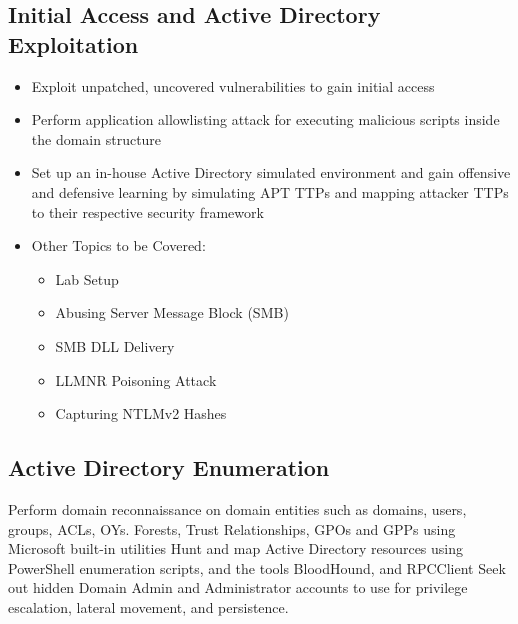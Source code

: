 \documentclass{article}
\begin{document}
\subsection{Initial Access and Active Directory Exploitation}
\begin{itemize}
    \item Exploit unpatched, uncovered vulnerabilities to gain initial access
    \item Perform application allowlisting attack for executing malicious scripts inside the domain structure
    \item Set up an in-house Active Directory simulated environment and gain offensive and defensive learning by simulating APT TTPs and mapping attacker TTPs to their respective security framework
    \item Other Topics to be Covered:
        \begin{itemize}
            \item Lab Setup
        \end{itemize}
        \begin{itemize}
            \item     Abusing Server Message Block (SMB)
        \end{itemize}
        \begin{itemize}
            \item SMB DLL Delivery
        \end{itemize}
        \begin{itemize}
            \item LLMNR Poisoning Attack
        \end{itemize}
        \begin{itemize}
            \item Capturing NTLMv2 Hashes
        \end{itemize}
\end{itemize}

\subsection{Active Directory Enumeration}
Perform domain reconnaissance on domain entities such as domains, users, groups, ACLs, OYs. Forests, Trust Relationships, GPOs and GPPs using Microsoft built-in utilities
Hunt and map Active Directory resources using PowerShell enumeration scripts, and the tools BloodHound, and RPCClient
Seek out hidden Domain Admin and Administrator accounts to use for privilege escalation, lateral movement, and persistence.
\end{document}
